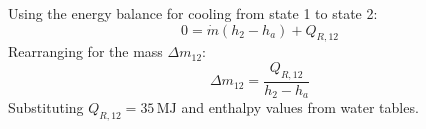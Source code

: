 Using the energy balance for cooling from state 1 to state 2:  
\[
0 = \dot{m} (h_2 - h_a) + Q_{R,12}
\]  
Rearranging for the mass \( \Delta m_{12} \):  
\[
\Delta m_{12} = \frac{Q_{R,12}}{h_2 - h_a}
\]  
Substituting \( Q_{R,12} = 35 \, \text{MJ} \) and enthalpy values from water tables.